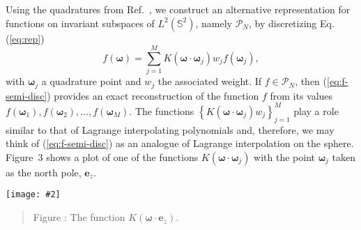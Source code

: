 \documentclass[landscape,a0b,final]{a0poster}
\newcommand{\HH}{{\mathcal P}}
\newcommand{\bomega}{{\boldsymbol{\omega}}}
\newenvironment{poster}{
  \begin{center}
  \begin{minipage}[c]{0.98\textwidth}
}{
  \end{minipage} 
  \end{center}
}
\newcommand{\myfig}[3][0]{
\begin{center}
  \texttt{[image: \#2]}
  \nobreak\medskip
\end{center}}
\newcommand{\mycaption}[1]{
  \begin{quote}
    {{\sc Figure} \arabic{figure}: #1}
  \end{quote}
  \stepcounter{figure}
}
\begin{document}
\begin{poster}
\begin{multicols}{3}
Using the quadratures from Ref.~\cite{AHR-BEY-2009}, we construct an alternative representation for functions on invariant
subspaces of $L^{2}\left(\mathbb{S}^{2}\right)$, namely $\HH_{N}$, by discretizing Eq. (\ref{eq:rep})
%
\begin{equation}
  f\left(\boldsymbol{\omega}\right)=\sum_{j=1}^{M}K\left(\bomega\cdot\bomega_{j}\right)w_{j}f\left(\bomega_{j}\right),
  \label{eq:f-semi-disc}
\end{equation}
%
with $\bomega_{j}$ a quadrature point and $w_{j}$ the associated weight. If $f\in\HH_{N}$, then (\ref{eq:f-semi-disc}) provides
an exact reconstruction of the function $f$ from its values $f\left(\bomega_{1}\right),f\left(\bomega_{2}\right),\dots,f\left(\bomega_{M}\right)$.
The functions $\left\{ K\left(\bomega\cdot\bomega_{j}\right)w_{j}\right\} _{j=1}^{M}$
play a role similar to that of Lagrange interpolating polynomials
and, therefore, we may think of (\ref{eq:f-semi-disc}) as an analogue
of Lagrange interpolation on the sphere. Figure~3 shows a plot of one of the functions $K\left(\bomega\cdot\bomega_{j}\right)$ with the point $\bomega_{j}$ taken as the north pole, $\mathbf{e}_z$.
\begin{center}
  \myfig[0]{splot.eps}{0.25}
  \mycaption{The function $K\left(\bomega\cdot\mathbf{e}_z\right)$.}
\end{center}



\end{multicols}
\end{poster}
\end{document}
